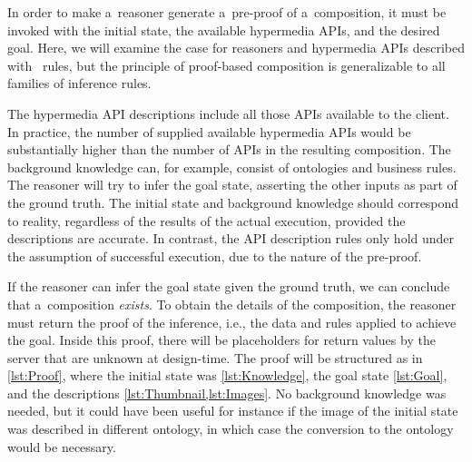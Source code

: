 In order to make a~reasoner generate a~pre-proof of a~composition,
it must be invoked with the initial state, the available hypermedia APIs, and the desired goal.
Here, we will examine the case for \nthree reasoners
and hypermedia APIs described with \restdesc\ \nthree rules,
but the principle of proof-based composition is generalizable
to all families of inference rules.

The hypermedia API descriptions include all those APIs available to the client.
In practice, the number of supplied available hypermedia APIs
would be substantially higher than the number of APIs in the resulting composition.
The background knowledge can, for example, consist of ontologies and business rules.
The reasoner will try to infer the goal state,
asserting the other inputs as part of the ground truth.
The initial state and background knowledge should correspond to reality,
regardless of the results of the actual execution,
provided the descriptions are accurate.
In contrast, the API description rules only hold under the assumption of successful execution,
due to the nature of the pre-proof.


If the reasoner can infer the goal state given the ground truth,
we can conclude that a~composition \emph{exists}.
To obtain the details of the composition,
the reasoner must return the proof of the inference,
i.e., the data and rules applied to achieve the goal.
Inside this proof,
there will be placeholders for return values by the server
that are unknown at design-time.
The proof will be structured as in \cref{lst:Proof},
where the initial state was \cref{lst:Knowledge},
the goal state \cref{lst:Goal},
and the descriptions \cref{lst:Thumbnail,lst:Images}.
No background knowledge was needed,
but it could have been useful for instance
if the image of the initial state was described in different ontology,
in which case the conversion to the \dbpedia ontology would be necessary.


